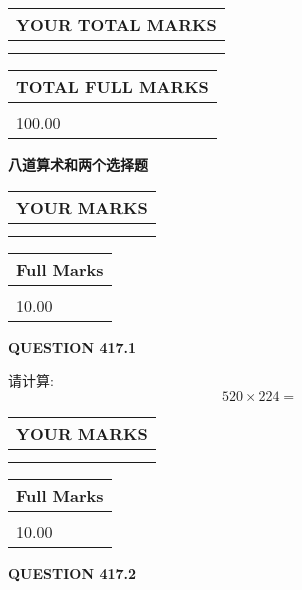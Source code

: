 \documentclass{ctexart}
\begin{document}
   
\vspace{0.2in}\noindent\begin{tabular}{|l|}
\hline
YOUR TOTAL MARKS  \\
\hline
 \\ 
 \\ 
\hline
\end{tabular}
\hspace{0.05in} \begin{tabular}{|l|}
\hline
TOTAL FULL MARKS  \\
\hline
 \\ 
100.00 \\
\hline
\end{tabular}
   
   
 \vspace{0.2in}
{\LARGE {\textbf{ 八道算术和两个选择题}}}
   
   
  
\vspace{0.2in}
  
\noindent\begin{tabular}{|l|}
\hline
 YOUR MARKS  \\
\hline
 \\ 
 \\ 
\hline
\end{tabular}
\hspace{0.05in} \begin{tabular}{|l|}
\hline
 Full Marks  \\
\hline
 \\ 
10.00 \\
\hline
\end{tabular}
{\textbf{\Large{QUESTION
417.1 
}}}
  
  
 
请计算:
\begin{equation}
520  \times    %
224 = \nonumber
\end{equation}
 

 

 
  
\vspace{0.2in}
  
\noindent\begin{tabular}{|l|}
\hline
 YOUR MARKS  \\
\hline
 \\ 
 \\ 
\hline
\end{tabular}
\hspace{0.05in} \begin{tabular}{|l|}
\hline
 Full Marks  \\
\hline
 \\ 
10.00 \\
\hline
\end{tabular}
{\textbf{\Large{QUESTION
417.2 
}}}
  
\end{document}
